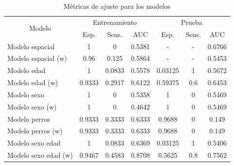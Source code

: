 \begin{center}
	\begin{table}[h]
		\centering
		\caption{Métricas de ajuste para los modelos}
		\label{model_metricas}
		\begin{tabular}{@{}lcccccc@{}}
			\toprule
			\multicolumn{1}{c}{\multirow{2}{*}{Modelo}} & \multicolumn{3}{c}{Entrenamiento}                          & \multicolumn{3}{c}{Prueba}            \\ \cmidrule(l){2-7} 
			\multicolumn{1}{c}{}                        & Esp. & Sens. & \multicolumn{1}{c|}{AUC}    & Esp. & Sens. & AUC    \\ \midrule
			\multicolumn{1}{l|}{Modelo espacial}            & 1             & 0       & \multicolumn{1}{c|}{0.5381} & -       & -            & 0.6766 \\
			\multicolumn{1}{l|}{Modelo espacial (w)}            & 0.96             & 0.125       & \multicolumn{1}{c|}{0.5864} & -       & -            & 0.5453 \\
			\multicolumn{1}{l|}{Modelo edad}            & 1             & 0.0833       & \multicolumn{1}{c|}{0.5578} & 0.03125       & 1            & 0.5672 \\
			\multicolumn{1}{l|}{Modelo edad (w)}        & 0.9333        & 0.2917       & \multicolumn{1}{c|}{0.6122} & 0.59375       & 0.6          & 0.6453 \\
			\multicolumn{1}{l|}{Modelo sexo}            & 1             & 0            & \multicolumn{1}{c|}{0.5358} & 1             & 0            & 0.5469 \\
			\multicolumn{1}{l|}{Modelo sexo (w)}        & 1             & 0            & \multicolumn{1}{c|}{0.4642} & 1             & 0            & 0.5469 \\
			\multicolumn{1}{l|}{Modelo perros}          & 0.9333        & 0.3333       & \multicolumn{1}{c|}{0.6333} & 0.9688        & 0            & 0.149  \\
			\multicolumn{1}{l|}{Modelo perros (w)}      & 0.9333        & 0.3333       & \multicolumn{1}{c|}{0.6333} & 0.9688        & 0            & 0.149  \\
			\multicolumn{1}{l|}{Modelo sexo edad}       & 1             & 0.0833       & \multicolumn{1}{c|}{0.6369} & 0.03125       & 1            & 0.5406 \\
			\multicolumn{1}{l|}{Modelo sexo edad (w)}   & 0.9467        & 0.4583       & \multicolumn{1}{c|}{0.8708} & 0.5625        & 0.8          & 0.7562 \\

\end{tabular}
\end{table}
\end{center}
